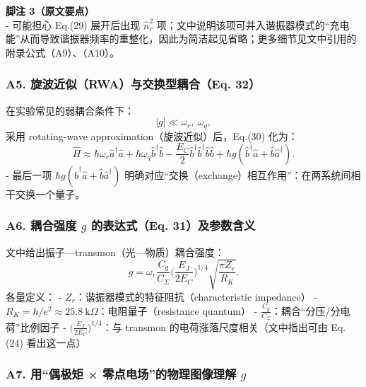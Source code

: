 \documentclass[12pt,a4paper,oneside]{ctexbook}
\begin{document}
\textbf{脚注 3（原文要点）}\\
- 可能担心 Eq.(29) 展开后出现 \(\hat n_r^2\)
项；文中说明该项可并入谐振器模式的``充电能''从而导致谐振器频率的重整化，因此为简洁起见省略；更多细节见文中引用的附录公式（A9）、（A10）。

\subsubsection{\texorpdfstring{\textbf{A5. 旋波近似（RWA）与交换型耦合（Eq.
32）}}{A5. 旋波近似（RWA）与交换型耦合（Eq. 32）}}\label{a5.-ux65cbux6ce2ux8fd1ux4f3crwaux4e0eux4ea4ux6362ux578bux8026ux5408eq.-32}

在实验常见的弱耦合条件下： \[
|g|\ll \omega_r,\ \omega_q,
\] 采用 rotating-wave approximation（旋波近似）后，Eq.(30) 化为： \[
\hat H \approx
\hbar\omega_r \hat a^\dagger\hat a
+\hbar\omega_q \hat b^\dagger\hat b
-\frac{E_C}{2}\hat b^\dagger\hat b^\dagger \hat b\hat b
+\hbar g(\hat b^\dagger \hat a+\hat b \hat a^\dagger).
\tag{32}
\] - 最后一项 \(\hbar g(\hat b^\dagger \hat a+\hat b \hat a^\dagger)\)
明确对应``交换（exchange）相互作用''：在两系统间相干交换一个量子。

\subsubsection{\texorpdfstring{\textbf{A6. 耦合强度 \(g\) 的表达式（Eq.
31）及参数含义}}{A6. 耦合强度 g 的表达式（Eq. 31）及参数含义}}\label{a6.-ux8026ux5408ux5f3aux5ea6-g-ux7684ux8868ux8fbeux5f0feq.-31ux53caux53c2ux6570ux542bux4e49}

文中给出振子---transmon（光---物质）耦合强度： \[
g=\omega_r\frac{C_g}{C_\Sigma}\Big(\frac{E_J}{2E_C}\Big)^{1/4}\sqrt{\frac{\pi Z_r}{R_K}}.
\tag{31}
\] 各量定义： - \(Z_r\)：谐振器模式的特征阻抗（characteristic
impedance） -
\(R_K=h/e^2 \approx 25.8~\text{k}\Omega\)：电阻量子（resistance
quantum） - \(\frac{C_g}{C_\Sigma}\)：耦合``分压/分电荷''比例因子 -
\(\Big(\frac{E_J}{2E_C}\Big)^{1/4}\)：与 transmon
的电荷涨落尺度相关（文中指出可由 Eq.(24) 看出这一点）

\subsubsection{\texorpdfstring{\textbf{A7. 用``偶极矩 ×
零点电场''的物理图像理解
\(g\)}}{A7. 用``偶极矩 × 零点电场''的物理图像理解 g}}\label{a7.-ux7528ux5076ux6781ux77e9-ux96f6ux70b9ux7535ux573aux7684ux7269ux7406ux56feux50cfux7406ux89e3-g}
\end{document}
